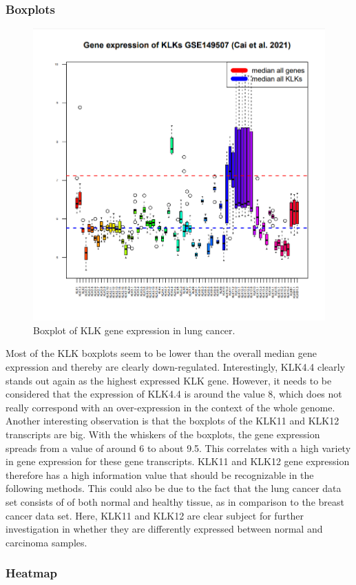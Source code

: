 \documentclass[
]{article}
\begin{document}
\hypertarget{boxplots-1}{%
\subsubsection{Boxplots}\label{boxplots-1}}

\begin{figure}

{\centering \includegraphics[width=0.5\linewidth]{images/Boxplot_lung} 

}

\caption{Boxplot of KLK gene expression in lung cancer.}\label{fig:Boxplot - lung }
\end{figure}

Most of the KLK boxplots seem to be lower than the overall median gene
expression and thereby are clearly down-regulated. Interestingly, KLK4.4
clearly stands out again as the highest expressed KLK gene. However, it
needs to be considered that the expression of KLK4.4 is around the value
8, which does not really correspond with an over-expression in the
context of the whole genome. Another interesting observation is that the
boxplots of the KLK11 and KLK12 transcripts are big. With the whiskers
of the boxplots, the gene expression spreads from a value of around 6 to
about 9.5. This correlates with a high variety in gene expression for
these gene transcripts. KLK11 and KLK12 gene expression therefore has a
high information value that should be recognizable in the following
methods. This could also be due to the fact that the lung cancer data
set consists of of both normal and healthy tissue, as in comparison to
the breast cancer data set. Here, KLK11 and KLK12 are clear subject for
further investigation in whether they are differently expressed between
normal and carcinoma samples.

\hypertarget{heatmap-1}{%
\subsubsection{Heatmap}\label{heatmap-1}}
\end{document}

